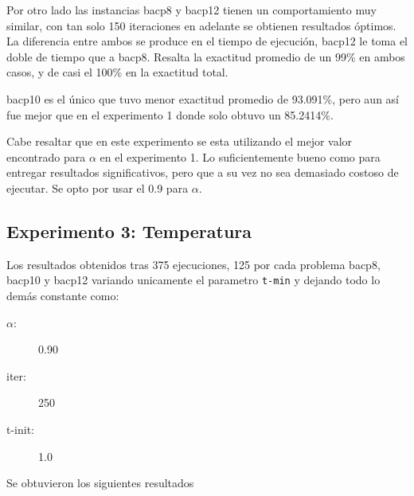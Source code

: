 \documentclass[letterpaper,10pt]{article}
\begin{document}
Por otro lado las instancias bacp8 y bacp12 tienen un comportamiento muy similar, con tan solo 150 iteraciones en adelante se obtienen resultados óptimos. La diferencia entre ambos se produce en el tiempo de ejecución, bacp12 le toma el doble de tiempo que a bacp8. Resalta la exactitud promedio de un 99\% en ambos casos, y de casi el 100\% en la exactitud total.

bacp10 es el único que tuvo menor exactitud promedio de 93.091\%, pero aun así fue mejor que en el experimento 1 donde solo obtuvo un 85.2414\%.

Cabe resaltar que en este experimento se esta utilizando el mejor valor encontrado para $\alpha$ en el experimento 1. Lo suficientemente bueno como para entregar resultados significativos, pero que a su vez no sea demasiado costoso de ejecutar. Se opto por usar el 0.9 para $\alpha$.





\subsection{Experimento 3: Temperatura}

Los resultados obtenidos tras 375 ejecuciones, 125 por cada problema bacp8, bacp10 y bacp12 variando unicamente el parametro \texttt{t-min} y dejando todo lo demás constante como:

\begin{description}
    \item[$\alpha$:] 0.90
    \item[iter:] 250
    \item[t-init:] 1.0
\end{description}
Se obtuvieron los siguientes resultados
\end{document}
